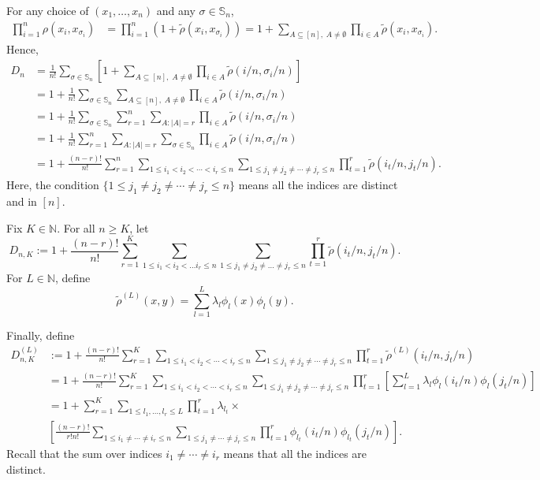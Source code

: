 \documentclass{amsart}
\newcommand{\NN}{\mathbb{N}}
\newcommand{\abs}[1]{\left\lvert #1 \right\rvert}
\newcommand{\perm}{\mathbb{S}}
\newcommand{\trho}{\tilde\rho}
\begin{document}
For any choice of $(x_1, \ldots, x_n)$ and any $\sigma \in \perm_n$,
\[
\begin{split}
\prod_{i=1}^n \rho(x_i, x_{\sigma_i}) &= \prod_{i=1}^n \left(1 + \trho(x_i, x_{\sigma_i}) \right)= 1 + \sum_{A \subseteq [n],\; A\neq \emptyset} \prod_{i\in A} \trho(x_i, x_{\sigma_i}).
\end{split}
\]
Hence, 
\[
\begin{split}
D_n &= \frac{1}{n!} \sum_{\sigma \in \perm_n} \left[1 + \sum_{A \subseteq [n],\; A\neq \emptyset} \prod_{i\in A} \trho(i/n, \sigma_i/n)\right]\\
&= 1 + \frac{1}{n!} \sum_{\sigma \in \perm_n}  \sum_{A \subseteq [n],\; A\neq \emptyset} \prod_{i\in A} \trho(i/n, \sigma_i/n)\\
&= 1 + \frac{1}{n!} \sum_{\sigma \in \perm_n} \sum_{r=1}^n \sum_{A: \abs{A}=r} \prod_{i \in A} \trho(i/n, \sigma_i/n)\\
&= 1 + \frac{1}{n!} \sum_{r=1}^n \sum_{A: \abs{A}=r} \sum_{\sigma \in \perm_n} \prod_{i \in A} \trho(i/n, \sigma_i/n)\\
&= 1 + \frac{(n-r)!}{n!} \sum_{r=1}^n \sum_{1\le i_1 < i_2 < \cdots < i_r \le n} \sum_{1\le j_1 \neq j_2 \neq \cdots \neq j_r \le n} \prod_{t=1}^r \trho(i_t/n, j_t/n).
\end{split}
\]
Here, the condition $\{1\le j_1 \neq j_2 \neq \cdots \neq j_r \le n\}$ means all the indices are distinct and in $[n]$.

Fix $K \in \NN$. For all $n\ge K$, let 
\[
D_{n,K}:= 1 + \frac{(n-r)!}{n!} \sum_{r=1}^K \sum_{1\le i_1 < i_2 < \ldots i_r \le n} \sum_{1\le j_1 \neq j_2 \neq \ldots \neq j_r \le n} \prod_{t=1}^r \trho(i_t/n, j_t/n).
\]
For $L\in \NN$, define 
\[
\trho^{(L)}(x,y) = \sum_{l=1}^L \lambda_l \phi_l(x) \phi_l(y).
\]

Finally, define 
\[
\begin{split}
D_{n,K}^{(L)}&:= 1 + \frac{(n-r)!}{n!} \sum_{r=1}^K \sum_{1\le i_1 < i_2 < \cdots < i_r \le n} \sum_{1\le j_1 \neq j_2 \neq \cdots \neq j_r \le n} \prod_{t=1}^r \trho^{(L)}(i_t/n, j_t/n)\\
&= 1 + \frac{(n-r)!}{n!} \sum_{r=1}^K \sum_{1\le i_1 < i_2 < \cdots < i_r \le n} \sum_{1\le j_1 \neq j_2 \neq \cdots \neq j_r \le n} \prod_{t=1}^r \left[ \sum_{l=1}^L \lambda_l \phi_l(i_t/n) \phi_l(j_t/n)\right]\\
&= 1 + \sum_{r=1}^K \sum_{1\le l_1, \ldots, l_r \le L} \prod_{t=1}^r \lambda_{l_t} \times \\
&\left[ \frac{(n-r)!}{r! n!} \sum_{1\le i_1 \neq \cdots \neq i_r \le n} \sum_{1\le j_1 \neq \cdots \neq j_r \le n} \prod_{t=1}^r \phi_{l_t}(i_t/n) \phi_{l_t}(j_t/n)\right]. 
\end{split}
\]
Recall that the sum over indices $i_1\neq \cdots \neq i_r$ means that all the indices are distinct. 
\end{document}
